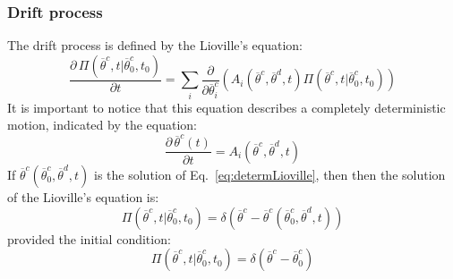 \subsubsection{Drift process}
\label{sec:CKDrift}
The drift process is defined by the Lioville’s equation:
\begin{equation}
\label{eq:lioville}
  \frac{\partial \, \Pi \left (\overline{\theta}^{c},t|\overline{\theta}^{c}_{0},t_{0}  \right ) }{\partial t} = \sum_{i}\frac{\partial }{\partial \overline{\theta}^{c}_{i}}\left ( A_{i}\left ( \overline{\theta}^{c},\overline{\theta}^{d},t \right ) \Pi \left (\overline{\theta}^{c},t|\overline{\theta}^{c}_{0},t_{0}  \right ) \right )
\end{equation}
It is important to notice that this equation describes a completely deterministic motion, indicated by the equation:
\begin{equation}
\label{eq:determLioville}
   \frac{\partial \, \overline{\theta}^{c}\left ( t \right ) }{\partial t} = A_{i}\left ( \overline{\theta}^{c},\overline{\theta}^{d},t \right ) 
\end{equation}
If $\overline{\theta}^{c} \left (\overline{\theta}^{c}_{0},\overline{\theta}^{d},t  \right )$ is the solution of Eq.~\ref{eq:determLioville}, then then the solution of the Lioville's equation is:
\begin{equation}
\label{eq:solLioville}
\Pi \left (\overline{\theta}^{c},t|\overline{\theta}^{c}_{0},t_{0}  \right ) = \delta\left ( \overline{\theta}^{c} - \overline{\theta}^{c}\left ( \overline{\theta}^{c}_{0},\overline{\theta}^{d},t \right ) \right )
\end{equation}
provided the initial condition:
\begin{equation}
\label{eq:solLiovilleInitCond}
\Pi \left (\overline{\theta}^{c},t|\overline{\theta}^{c}_{0},t_{0}  \right ) = \delta\left ( \overline{\theta}^{c} - \overline{\theta}^{c}_{0} \right )
\end{equation}
%
%
%
%
